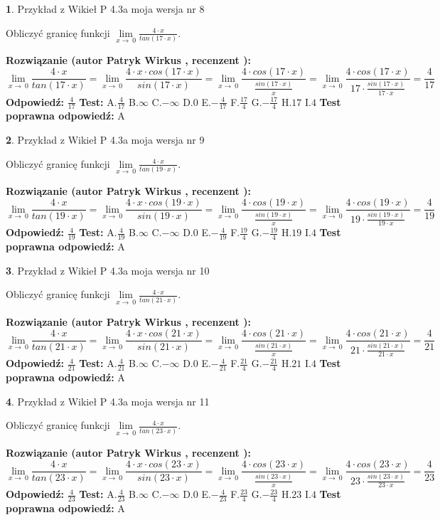 \documentclass[12pt, a4paper]{article}
\theoremstyle{definition} %
\newtheorem{zad}{}
\newcommand{\zadStart}[1]{\begin{zad}#1\newline}
\newcommand{\zadStop}{\end{zad}}
\newcommand{\rozwStart}[2]{\noindent \textbf{Rozwiązanie (autor #1 , recenzent #2): }\newline}
\newcommand{\rozwStop}{\newline}
\newcommand{\odpStart}{\noindent \textbf{Odpowiedź:}\newline}
\newcommand{\odpStop}{\newline}
\newcommand{\testStart}{\noindent \textbf{Test:}\newline}
\newcommand{\testStop}{\newline}
\newcommand{\kluczStart}{\noindent \textbf{Test poprawna odpowiedź:}\newline}
\newcommand{\kluczStop}{\newline}
\begin{document}
\zadStart{Przykład z Wikieł P 4.3a moja wersja nr 8}


Obliczyć granicę funkcji $\lim\limits_{x\to\ 0}\frac{4 \cdot x}{tan(17 \cdot x)}$.
\zadStop
\rozwStart{Patryk Wirkus}{}
$$\lim\limits_{x\to\ 0}\frac{4 \cdot x}{tan(17 \cdot x)}=\lim\limits_{x\to\ 0}\frac{4 \cdot x \cdot cos(17 \cdot x)}{sin(17 \cdot x)}=\lim\limits_{x\to\ 0}\frac{4 \cdot cos(17 \cdot x)}{\frac{sin(17 \cdot x)}{x}}=\lim\limits_{x\to\ 0}\frac{4 \cdot cos(17 \cdot x)}{17 \cdot \frac{sin(17 \cdot x)}{17 \cdot x}} = \frac{4}{17}$$
\rozwStop
\odpStart
$\frac{4}{17}$
\odpStop
\testStart
A.$\frac{4}{17}$
B.$\infty$
C.$-\infty$
D.$0$
E.$-\frac{4}{17}$
F.$\frac{17}{4}$
G.$-\frac{17}{4}$
H.$17$
I.$4$
\testStop
\kluczStart
A
\kluczStop



\zadStart{Przykład z Wikieł P 4.3a moja wersja nr 9}


Obliczyć granicę funkcji $\lim\limits_{x\to\ 0}\frac{4 \cdot x}{tan(19 \cdot x)}$.
\zadStop
\rozwStart{Patryk Wirkus}{}
$$\lim\limits_{x\to\ 0}\frac{4 \cdot x}{tan(19 \cdot x)}=\lim\limits_{x\to\ 0}\frac{4 \cdot x \cdot cos(19 \cdot x)}{sin(19 \cdot x)}=\lim\limits_{x\to\ 0}\frac{4 \cdot cos(19 \cdot x)}{\frac{sin(19 \cdot x)}{x}}=\lim\limits_{x\to\ 0}\frac{4 \cdot cos(19 \cdot x)}{19 \cdot \frac{sin(19 \cdot x)}{19 \cdot x}} = \frac{4}{19}$$
\rozwStop
\odpStart
$\frac{4}{19}$
\odpStop
\testStart
A.$\frac{4}{19}$
B.$\infty$
C.$-\infty$
D.$0$
E.$-\frac{4}{19}$
F.$\frac{19}{4}$
G.$-\frac{19}{4}$
H.$19$
I.$4$
\testStop
\kluczStart
A
\kluczStop



\zadStart{Przykład z Wikieł P 4.3a moja wersja nr 10}


Obliczyć granicę funkcji $\lim\limits_{x\to\ 0}\frac{4 \cdot x}{tan(21 \cdot x)}$.
\zadStop
\rozwStart{Patryk Wirkus}{}
$$\lim\limits_{x\to\ 0}\frac{4 \cdot x}{tan(21 \cdot x)}=\lim\limits_{x\to\ 0}\frac{4 \cdot x \cdot cos(21 \cdot x)}{sin(21 \cdot x)}=\lim\limits_{x\to\ 0}\frac{4 \cdot cos(21 \cdot x)}{\frac{sin(21 \cdot x)}{x}}=\lim\limits_{x\to\ 0}\frac{4 \cdot cos(21 \cdot x)}{21 \cdot \frac{sin(21 \cdot x)}{21 \cdot x}} = \frac{4}{21}$$
\rozwStop
\odpStart
$\frac{4}{21}$
\odpStop
\testStart
A.$\frac{4}{21}$
B.$\infty$
C.$-\infty$
D.$0$
E.$-\frac{4}{21}$
F.$\frac{21}{4}$
G.$-\frac{21}{4}$
H.$21$
I.$4$
\testStop
\kluczStart
A
\kluczStop



\zadStart{Przykład z Wikieł P 4.3a moja wersja nr 11}


Obliczyć granicę funkcji $\lim\limits_{x\to\ 0}\frac{4 \cdot x}{tan(23 \cdot x)}$.
\zadStop
\rozwStart{Patryk Wirkus}{}
$$\lim\limits_{x\to\ 0}\frac{4 \cdot x}{tan(23 \cdot x)}=\lim\limits_{x\to\ 0}\frac{4 \cdot x \cdot cos(23 \cdot x)}{sin(23 \cdot x)}=\lim\limits_{x\to\ 0}\frac{4 \cdot cos(23 \cdot x)}{\frac{sin(23 \cdot x)}{x}}=\lim\limits_{x\to\ 0}\frac{4 \cdot cos(23 \cdot x)}{23 \cdot \frac{sin(23 \cdot x)}{23 \cdot x}} = \frac{4}{23}$$
\rozwStop
\odpStart
$\frac{4}{23}$
\odpStop
\testStart
A.$\frac{4}{23}$
B.$\infty$
C.$-\infty$
D.$0$
E.$-\frac{4}{23}$
F.$\frac{23}{4}$
G.$-\frac{23}{4}$
H.$23$
I.$4$
\testStop
\kluczStart
A
\kluczStop
\end{document}

